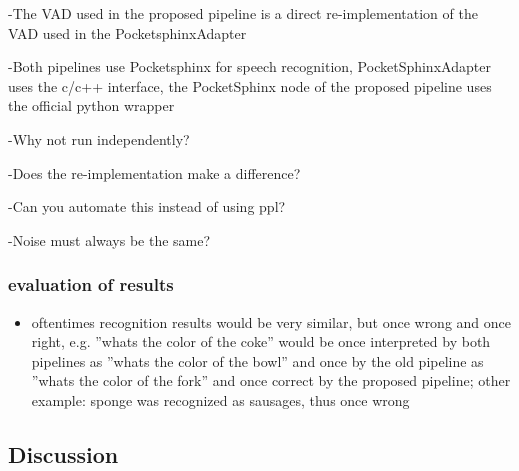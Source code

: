 -The VAD used in the proposed pipeline is a direct re-implementation of the VAD used in the PocketsphinxAdapter

-Both pipelines use Pocketsphinx for speech recognition, PocketSphinxAdapter uses the c/c++ interface, the PocketSphinx node of the proposed pipeline uses the official python wrapper

-Why not run independently? 

-Does the re-implementation make a difference?

-Can you automate this instead of using ppl?

-Noise must always be the same?


\subsubsection{evaluation of results}


\begin{itemize}
	\item oftentimes recognition results would be very similar, but once wrong and once right, e.g. ''whats the color of the coke'' would be once interpreted by both pipelines as ''whats the color of the bowl'' and once by the old pipeline as ''whats the color of the fork'' and once correct by the proposed pipeline; other example: sponge was recognized as sausages, thus once wrong
\end{itemize}

\subsection{Discussion}


